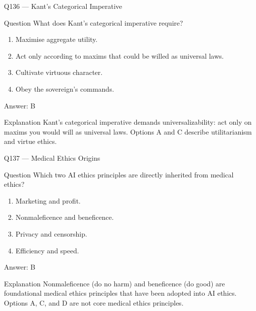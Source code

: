 \documentclass[aspectratio=169,8pt]{beamer}
\begin{document}
\begin{frame}{Q136 --- Kant's Categorical Imperative}
\begin{block}{Question}
What does Kant's categorical imperative require?
\begin{enumerate}
\item Maximise aggregate utility.
\item Act only according to maxims that could be willed as universal laws.
\item Cultivate virtuous character.
\item Obey the sovereign's commands.
\end{enumerate} 	\end{block}
\begin{exampleblock}{Answer: B}\end{exampleblock}
\begin{block}{Explanation}
Kant's categorical imperative demands universalizability: act only on maxims you would will as universal laws. Options A and C describe utilitarianism and virtue ethics.
\end{block}
\end{frame}

\begin{frame}{Q137 --- Medical Ethics Origins}
\begin{block}{Question}
Which two AI ethics principles are directly inherited from medical ethics?
\begin{enumerate}
\item Marketing and profit.
\item Nonmaleficence and beneficence.
\item Privacy and censorship.
\item Efficiency and speed.
\end{enumerate} 	\end{block}
\begin{exampleblock}{Answer: B}\end{exampleblock}
\begin{block}{Explanation}
Nonmaleficence (do no harm) and beneficence (do good) are foundational medical ethics principles that have been adopted into AI ethics. Options A, C, and D are not core medical ethics principles.
\end{block}
\end{frame}
\end{document}
